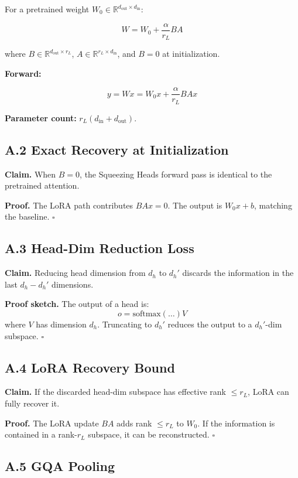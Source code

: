 For a pretrained weight $W_0 \in \mathbb{R}^{d_\text{out} \times d_\text{in}}$:

\[
W = W_0 + \frac{\alpha}{r_L} B A
\]

where $B \in \mathbb{R}^{d_\text{out} \times r_L}$, $A \in \mathbb{R}^{r_L \times d_\text{in}}$, and $B = 0$ at initialization.

\textbf{Forward:}

\[
y = W x = W_0 x + \frac{\alpha}{r_L} B A x
\]

\textbf{Parameter count:} $r_L (d_\text{in} + d_\text{out})$.

\subsection{A.2 Exact Recovery at Initialization}

\textbf{Claim.} When $B = 0$, the Squeezing Heads forward pass is identical to 
the pretrained attention.

\textbf{Proof.} The LoRA path contributes $B A x = 0$. The output is $W_0 x + b$, 
matching the baseline. $\square$

\subsection{A.3 Head-Dim Reduction Loss}

\textbf{Claim.} Reducing head dimension from $d_h$ to $d_h'$ discards the 
information in the last $d_h - d_h'$ dimensions.

\textbf{Proof sketch.} The output of a head is:
\[
o = \text{softmax}(\ldots) V
\]
where $V$ has dimension $d_h$. Truncating to $d_h'$ reduces the output to 
a $d_h'$-dim subspace. $\square$

\subsection{A.4 LoRA Recovery Bound}

\textbf{Claim.} If the discarded head-dim subspace has effective rank $\leq r_L$, 
LoRA can fully recover it.

\textbf{Proof.} The LoRA update $B A$ adds rank $\leq r_L$ to $W_0$. If the 
information is contained in a rank-$r_L$ subspace, it can be reconstructed. 
$\square$

\subsection{A.5 GQA Pooling}

